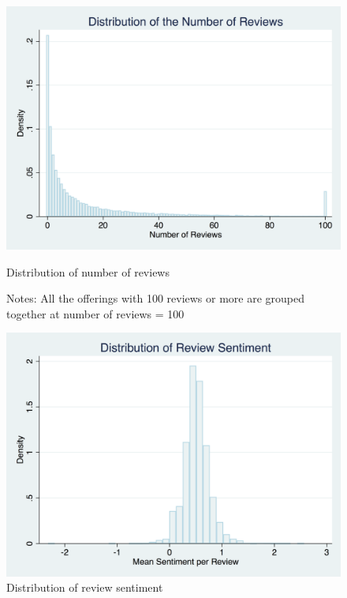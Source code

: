 \begin{figure}\centering
	\includegraphics[width=.8\textwidth]{figures/num_reviews_dist-DISC-100}
	\caption{Distribution of number of reviews}
	\caption*{Notes: All the offerings with 100 reviews or more are grouped together at number of reviews = 100}
\end{figure}

\begin{figure}\centering
	\includegraphics[width=.8\textwidth]{figures/review_sentiment_dist}
	\caption{Distribution of review sentiment}
\end{figure}


























